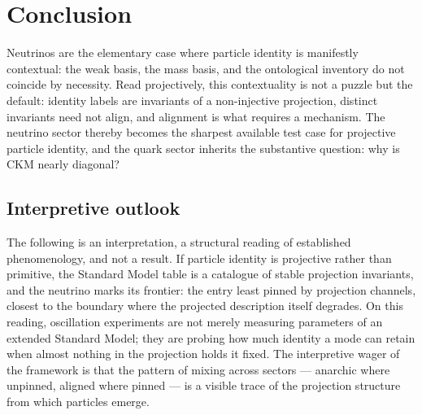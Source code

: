 \documentclass[11pt,a4paper]{article}
\theoremstyle{definition}
\begin{document}
  \section{Conclusion}
    \label{sec:conclusion}

    Neutrinos are the elementary case where particle identity is manifestly contextual: the weak basis, the mass
    basis, and the ontological inventory do not coincide by necessity.
    Read projectively, this contextuality is not a puzzle but the default: identity labels are invariants of a
    non-injective projection, distinct invariants need not align, and alignment is what requires a mechanism.
    The neutrino sector thereby becomes the sharpest available test case for projective particle identity, and
    the quark sector inherits the substantive question: why is CKM nearly diagonal?

    \subsection*{Interpretive outlook}
    The following is an interpretation, a structural reading of established phenomenology, and not a result.
    If particle identity is projective rather than primitive, the Standard Model table is a catalogue of stable
    projection invariants, and the neutrino marks its frontier: the entry least pinned by projection channels,
    closest to the boundary where the projected description itself degrades.
    On this reading, oscillation experiments are not merely measuring parameters of an extended Standard Model;
    they are probing how much identity a mode can retain when almost nothing in the projection holds it fixed.
    The interpretive wager of the framework is that the pattern of mixing across sectors --- anarchic where
    unpinned, aligned where pinned --- is a visible trace of the projection structure from which particles
    emerge.

  
  
\end{document}
